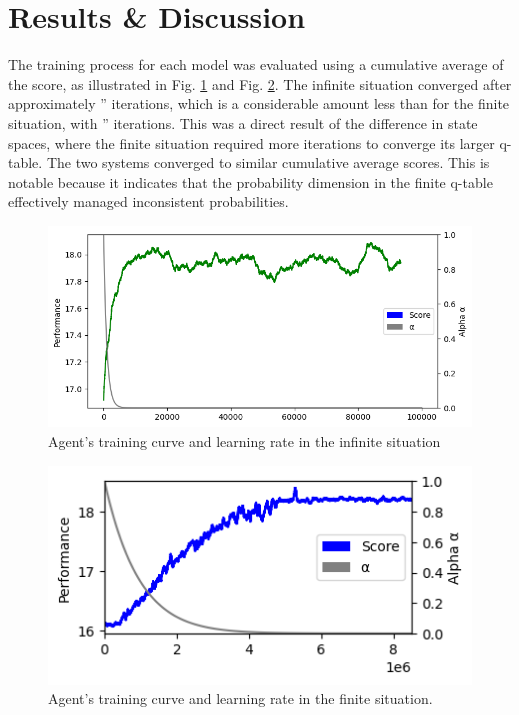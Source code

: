 \section{Results \& Discussion}

The training process for each model was evaluated using a cumulative average of the score, as illustrated in Fig. \ref{fig: Training curve - Infinite} and Fig. \ref{fig: Training curve - Finite}. The infinite situation converged after approximately '' iterations, which is a considerable amount less than for the finite situation, with '' iterations. This was a direct result of the difference in state spaces, where the finite situation required more iterations to converge its larger q-table. The two systems converged to similar cumulative average scores. This is notable because it indicates that the probability dimension in the finite q-table effectively managed inconsistent probabilities. 

\begin{figure}[ht] 
    \centering
    \includegraphics[width=\singlefigure]{figures/infinite_training_curve.png}
    \caption{Agent's training curve and learning rate in the infinite situation}
    \label{fig: Training curve - Infinite} 
\end{figure}



\begin{figure}[ht] 
    \centering
    \includegraphics[width=\singlefigure]{figures/finite_training_curve.png}
    \caption{Agent's training curve and learning rate in the finite situation.}
    \label{fig: Training curve - Finite} 
\end{figure}

